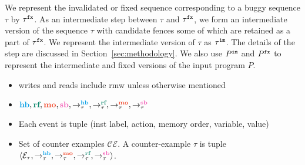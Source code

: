 We represent the invalidated or fixed sequence corresponding to a 
buggy sequence $\tau$ by ${\tau}^{\mathtt{fx}}$. 
%
As an intermediate step between $\tau$ and ${\tau}^{\mathtt{fx}}$, we form an 
intermediate version of the sequence $\tau$ with candidate fences
some of which are retained as a part of ${\tau}^{\mathtt{fx}}$. We represent
the intermediate version of $\tau$ as ${\tau}^{\mathtt{im}}$. The details
of the step are discussed in Section~\ref{sec:methodology}.
%
We also use ${P}^{\mathtt{im}}$ and ${P}^{\mathtt{fx}}$ to represent the intermediate and
fixed versions of the input program $P$.

\begin{itemize}

	\item writes and reads include rmw unless otherwise mentioned 
	\item $ \lhb, \lrf, \lmo, \lsb, \setHB, \setRF, \setMO, \setSB $ 
	\item Each event is tuple (inst label, action, memory order, variable, value)  
	\item Set of counter examples $ \mathcal{CE} $. A counter-example $ \tau $ is tuple $ \langle \events_\tau, \setHB, \setMO, \setRF, \setSB  \rangle $.  
\end{itemize}